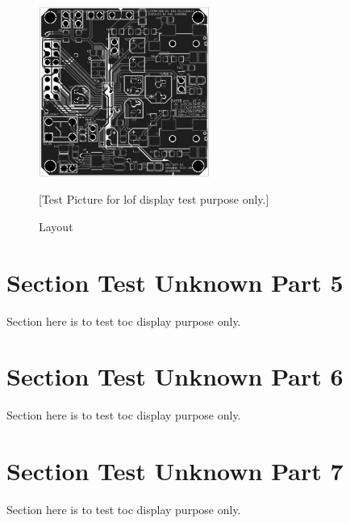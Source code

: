   
\begin{figure}[!hbp]
\begin{center}
\includegraphics[width=0.5\textwidth]{graphic/CS4270_PCB.PNG}
\caption{Layout}
\label{fig:CS4270_PCB}
[Test Picture for lof display test purpose only.]
\end{center}
\end{figure}



\section{Section Test Unknown Part 5}
Section here is to test toc display purpose only.
\section{Section Test Unknown Part 6}
Section here is to test toc display purpose only.
\section{Section Test Unknown Part 7}
Section here is to test toc display purpose only.